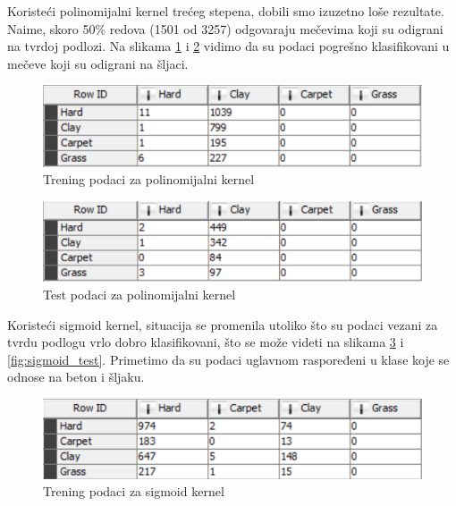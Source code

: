 \documentclass[a4paper]{article}
\begin{document}
Koristeći polinomijalni kernel trećeg stepena, dobili smo izuzetno loše rezultate.
Naime, skoro 50\% redova (1501 od 3257) odgovaraju mečevima koji su odigrani na tvrdoj podlozi.
Na slikama \ref{fig:poly_training} i \ref{fig:poly_test} vidimo da su podaci pogrešno klasifikovani u
mečeve koji su odigrani na šljaci.

\begin{figure}[h!]
	\begin{center}
		\includegraphics[scale=0.80]{KNIME_project/SVM/poly_training}
	\end{center}
	\caption{Trening podaci za polinomijalni kernel}
	\label{fig:poly_training}
\end{figure}

\begin{figure}[h!]
	\begin{center}
		\includegraphics[scale=0.80]{KNIME_project/SVM/poly_test}
	\end{center}
	\caption{Test podaci za polinomijalni kernel}
	\label{fig:poly_test}
\end{figure}


Koristeći sigmoid kernel, situacija se promenila utoliko što su podaci vezani za tvrdu podlogu
vrlo dobro klasifikovani, što se može videti na slikama \ref{fig:sigmoid_training} i \ref{fig:sigmoid_test}.
Primetimo da su podaci uglavnom raspoređeni u klase koje se odnose na beton i šljaku.

\begin{figure}[h!]
	\begin{center}
		\includegraphics[scale=0.80]{KNIME_project/SVM/sigmoid_training}
	\end{center}
	\caption{Trening podaci za sigmoid kernel}
	\label{fig:sigmoid_training}
\end{figure}
\end{document}
